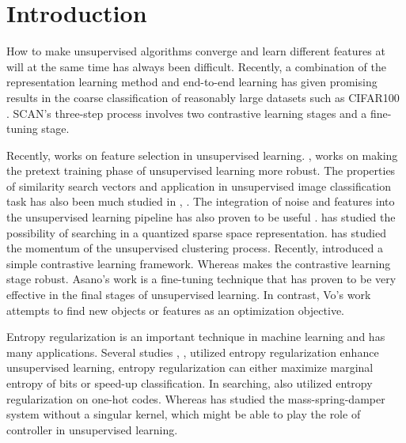 \documentclass[journal]{journal}
\begin{document}
%
\IEEEpeerreviewmaketitle



\section{Introduction}

How to make unsupervised algorithms converge and learn different features at will at the same time has always been difficult. Recently, a combination of the representation learning method and end-to-end learning has given promising results in the coarse classification of reasonably large datasets such as CIFAR100 \cite{wvangansbeke2020scan}. SCAN's \cite{wvangansbeke2020scan} three-step process involves two contrastive learning stages and a fine-tuning stage.  

Recently, \cite{JunGuo_AAAI_2020} works on feature selection in unsupervised learning. \cite{pretextInvariant2020}, \cite{pretrain2019Uncurated} works on making the pretext training phase of unsupervised learning more robust. 
The properties of similarity search vectors and application in unsupervised image classification task has also been much studied in  \cite{alex2018spreading}, \cite{spreadLocal2019}. The integration of noise and features into the unsupervised learning pipeline has also proven to be useful \cite{bojanowski2017unsupervised}. \cite{jain2016approximate} \cite{Zhang2015SparseCQ} has studied the possibility of searching in a quantized sparse space representation. \cite{he2019momentum} has studied the momentum of the unsupervised clustering process. Recently, \cite{chen2020simple} introduced a simple contrastive learning framework. Whereas \cite{chuang2020debiased} makes the contrastive learning stage robust. Asano's work \cite{asano2020self} is a fine-tuning technique that has proven to be very effective in the final stages of unsupervised learning. In contrast, Vo's work \cite{vo2019unsupervised} attempts to find new objects or features as an optimization objective. 

Entropy regularization is an important technique in machine learning and has many applications. Several studies \cite{pereyra2017regularizing}, \cite{cuturi2013sinkhorn}, \cite{Liong2015DeepHF} utilized entropy regularization enhance unsupervised learning, entropy regularization can either maximize marginal entropy of bits or speed-up classification. In searching, \cite{subic2017} also utilized entropy regularization on one-hot codes.  Whereas \cite{entropy2015Spring} has studied the mass-spring-damper system without a singular kernel, which might be able to play the role of controller in unsupervised learning. 
\end{document}
